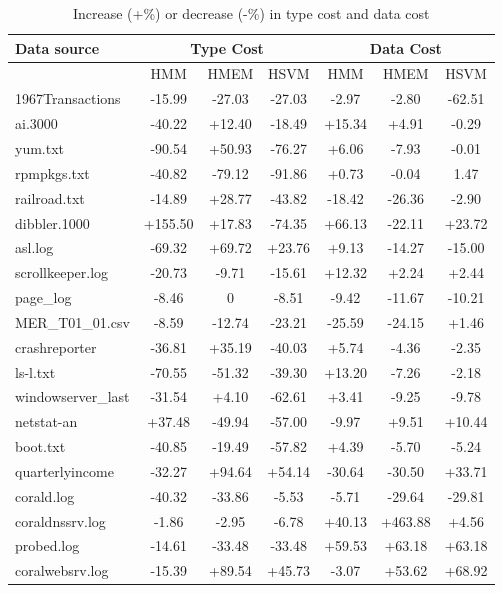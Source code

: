 \begin{table}[th]
\begin{center}
\begin{tabular}{|l||c|c|c||c|c|c|}\hline
Data source & \multicolumn{3}{|c||}{Type Cost} &
\multicolumn{3}{|c|}{Data Cost}\\ \hline & HMM & HMEM & HSVM & HMM &
HMEM & HSVM \\ \hline 
1967Transactions & -15.99 & -27.03 & -27.03 & -2.97
& -2.80 & -62.51    \\\hline 
ai.3000 & -40.22 & +12.40 & -18.49 & +15.34 & +4.91 & -0.29 \\ \hline
yum.txt & -90.54 & +50.93 & -76.27 & +6.06 & -7.93 & -0.01  \\ \hline
rpmpkgs.txt & -40.82 & -79.12 & -91.86 & +0.73 & -0.04 & 1.47 \\ \hline
railroad.txt & -14.89 & +28.77 & -43.82 & -18.42 & -26.36 & -2.90   \\ \hline
dibbler.1000 & +155.50 & +17.83 & -74.35 & +66.13 & -22.11 & +23.72    \\ \hline
asl.log & -69.32 & +69.72 & +23.76 & +9.13 & -14.27 & -15.00 \\ \hline
scrollkeeper.log & -20.73 & -9.71 & -15.61 & +12.32 & +2.24 & +2.44  \\ \hline
page\_log & -8.46 & 0 & -8.51 & -9.42 & -11.67 & -10.21 \\ \hline
MER\_T01\_01.csv & -8.59 & -12.74 & -23.21 & -25.59 & -24.15 & +1.46 \\ \hline
crashreporter & -36.81 & +35.19 & -40.03 & +5.74 & -4.36 & -2.35 \\ \hline
ls-l.txt & -70.55 & -51.32 & -39.30 & +13.20 & -7.26 & -2.18 \\ \hline
windowserver\_last & -31.54 & +4.10 & -62.61 & +3.41 & -9.25 & -9.78  \\ \hline
netstat-an & +37.48 & -49.94 & -57.00 & -9.97 & +9.51 & +10.44 \\ \hline
boot.txt & -40.85 & -19.49 & -57.82 & +4.39 & -5.70 & -5.24 \\ \hline
quarterlyincome & -32.27 & +94.64 & +54.14 & -30.64 & -30.50 & +33.71    \\ \hline
corald.log & -40.32 & -33.86 & -5.53 & -5.71 & -29.64 & -29.81   \\ \hline
coraldnssrv.log  & -1.86 & -2.95 & -6.78 & +40.13 & +463.88 & +4.56 \\ \hline
probed.log & -14.61 & -33.48 & -33.48 & +59.53 & +63.18 & +63.18 \\ \hline
coralwebsrv.log & -15.39 & +89.54 & +45.73 & -3.07 & +53.62 & +68.92   \\
               \hline
\end{tabular}
\caption{Increase (+\%) or decrease (-\%) in type cost and data cost}
\label{tab:complexity}
\end{center}
\end{table}

